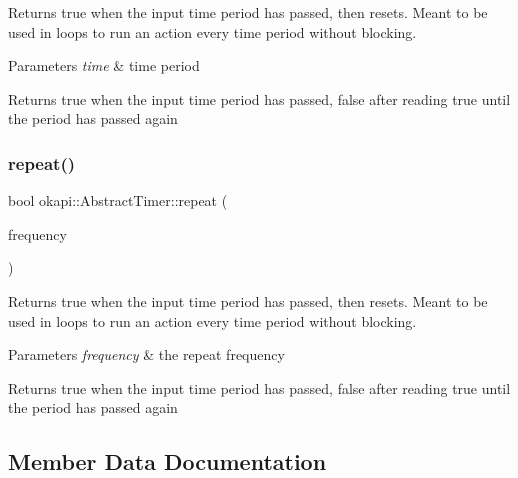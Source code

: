 Returns true when the input time period has passed, then resets. Meant to be used in loops to run an action every time period without blocking.


\begin{DoxyParams}{Parameters}
{\em time} & time period \\
\hline
\end{DoxyParams}
\begin{DoxyReturn}{Returns}
true when the input time period has passed, false after reading true until the period has passed again 
\end{DoxyReturn}
\mbox{\label{classokapi_1_1AbstractTimer_a9153fc8d0b6daf843fa533bf601a15dd}} 
\subsubsection{\texorpdfstring{repeat()}{repeat()}\hspace{0.1cm}{\footnotesize\ttfamily [2/2]}}
{\footnotesize\ttfamily bool okapi\+::\+Abstract\+Timer\+::repeat (\begin{DoxyParamCaption}\item[{Q\+Frequency}]{frequency }\end{DoxyParamCaption})\hspace{0.3cm}{\ttfamily [virtual]}}

Returns true when the input time period has passed, then resets. Meant to be used in loops to run an action every time period without blocking.


\begin{DoxyParams}{Parameters}
{\em frequency} & the repeat frequency \\
\hline
\end{DoxyParams}
\begin{DoxyReturn}{Returns}
true when the input time period has passed, false after reading true until the period has passed again 
\end{DoxyReturn}


\subsection{Member Data Documentation}
\mbox{\label{classokapi_1_1AbstractTimer_ace6c48ceaa4736cca3d34345fc8a9f5b}} 
